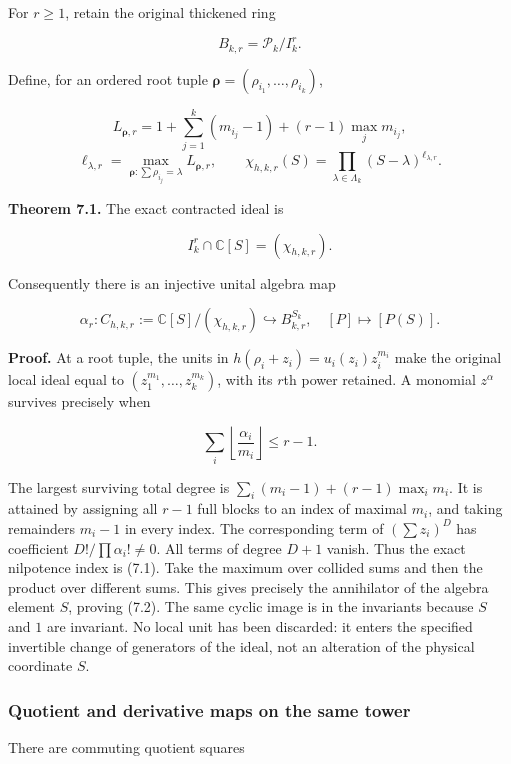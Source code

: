 For \(r\ge1\), retain the original thickened ring

\[B_{k,r}=\mathcal P_k/I_k^r.\]

Define, for an ordered root tuple
\(\boldsymbol\rho=(\rho_{i_1},\ldots,\rho_{i_k})\),

\[L_{\boldsymbol\rho,r}=1+\sum_{j=1}^k(m_{i_j}-1)+(r-1)\max_jm_{i_j},\]
\[\ell_{\lambda,r}=\max_{\boldsymbol\rho:\sum\rho_{i_j}=\lambda}L_{\boldsymbol\rho,r},\qquad
\boxed{\chi_{h,k,r}(S)=\prod_{\lambda\in\Lambda_k}(S-\lambda)^{\ell_{\lambda,r}}.}\tag{7.1}\]

\textbf{Theorem 7.1.} The exact contracted ideal is

\[\boxed{I_k^r\cap\mathbb C[S]=(\chi_{h,k,r}).}\tag{7.2}\]

Consequently there is an injective unital algebra map

\[\boxed{\alpha_r:C_{h,k,r}:=\mathbb C[S]/(\chi_{h,k,r})\hookrightarrow B_{k,r}^{S_k},\quad[P]\mapsto[P(S)].}\tag{7.3}\]

\textbf{Proof.} At a root tuple, the units in
\(h(\rho_i+z_i)=u_i(z_i)z_i^{m_i}\) make the original local ideal equal
to \((z_1^{m_1},\ldots,z_k^{m_k})\), with its \(r\)th power retained. A
monomial \(z^\alpha\) survives precisely when

\[\sum_i\left\lfloor\frac{\alpha_i}{m_i}\right\rfloor\le r-1.\tag{7.4}\]

The largest surviving total degree is \(\sum_i(m_i-1)+(r-1)\max_i m_i\).
It is attained by assigning all \(r-1\) full blocks to an index of
maximal \(m_i\), and taking remainders \(m_i-1\) in every index. The
corresponding term of \((\sum z_i)^D\) has coefficient
\(D!/\prod\alpha_i!\ne0\). All terms of degree \(D+1\) vanish. Thus the
exact nilpotence index is (7.1). Take the maximum over collided sums and
then the product over different sums. This gives precisely the
annihilator of the algebra element \(S\), proving (7.2). The same cyclic
image is in the invariants because \(S\) and \(1\) are invariant. No
local unit has been discarded: it enters the specified invertible change
of generators of the ideal, not an alteration of the physical coordinate
\(S\).

\subsubsection{Quotient and derivative maps on the same
tower}\label{cyclic_sum:quotient-and-derivative-maps-on-the-same-tower}

There are commuting quotient squares

